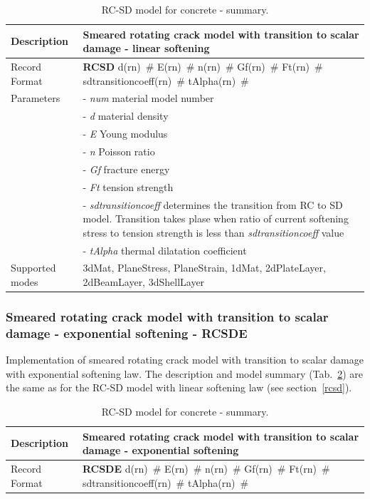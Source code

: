 \documentclass[a4paper]{article}
\newcommand{\descitem}[1]{{\noindent \bf #1}}
\newcommand{\elemparam}[2]{{{#1\tiny (#2)}~\#}}
\newcommand{\param}[1]{{\it #1}}
\begin{document}
\begin{table}[!htb]
\begin{tabular}{|l|p{9cm}|}
\hline
Description & Smeared rotating crack model with transition to scalar
damage - linear softening\\
\hline
Record Format & \descitem{RCSD} \elemparam{d}{rn} \elemparam{E}{rn}
\elemparam{n}{rn} \elemparam{Gf}{rn} \elemparam{Ft}{rn} \elemparam{sdtransitioncoeff}{rn} \elemparam{tAlpha}{rn} \\
Parameters &- \param{num} material model number\\
&- \param{d} material density\\
&- \param{E} Young modulus\\
&- \param{n} Poisson ratio\\
&- \param{Gf} fracture energy\\
&- \param{Ft} tension strength\\
&- \param{sdtransitioncoeff} determines the transition from RC to SD
model. Transition takes plase when ratio of current softening
stress to tension strength is less than  \param{sdtransitioncoeff} value\\
&- \param{tAlpha} thermal dilatation coefficient\\
Supported modes& 3dMat, PlaneStress, PlaneStrain, 1dMat,
2dPlateLayer, 2dBeamLayer, 3dShellLayer\\
\hline
\end{tabular}
\caption{RC-SD model for  concrete - summary.}
\label{rcsd_table}
\end{table}



\subsubsection{Smeared rotating crack model with transition to scalar
damage - exponential softening - RCSDE}
\label{rcsde}
Implementation of smeared rotating crack model with transition to
scalar damage with exponential softening law.
The description and model summary (Tab.~\ref{rcsde_table}) are the
same as for the RC-SD model with linear softening law (see section~\ref{rcsd}).
\begin{table}[!htb]
\begin{tabular}{|l|p{9cm}|}
\hline
Description & Smeared rotating crack model with transition to scalar
damage - exponential softening\\
\hline
Record Format & \descitem{RCSDE} \elemparam{d}{rn} \elemparam{E}{rn}
\elemparam{n}{rn} \elemparam{Gf}{rn} \elemparam{Ft}{rn} \elemparam{sdtransitioncoeff}{rn} \elemparam{tAlpha}{rn} \\
\hline
\end{tabular}
\caption{RC-SD model for  concrete - summary.}
\label{rcsde_table}
\end{table}
\end{document}

